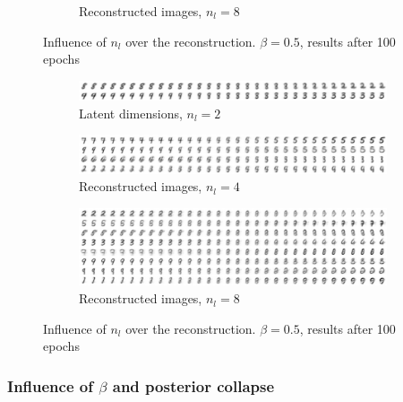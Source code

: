 \documentclass{article}
\begin{document}
\begin{figure}
\begin{subfigure}[b]{.2\textwidth}
    \caption{Reconstructed images, $n_l = 8$}
    \label{subfig:recons n_l=8}
  \end{subfigure}
  \caption{Influence of $n_l$ over the reconstruction. $\beta=0.5$, results after 100 epochs}
  \label{fig:n_l influence reconstruction}
\end{figure}

\begin{figure}
  \centering
  \begin{subfigure}[b]{.2\textwidth}
    \centering
    \includegraphics[width=\textwidth]{report/images/lat2/vae_0.5_0.5_ep100_lat2_hid512_2201-0938.pt_latent_dim.png}
    \caption{Latent dimensions, $n_l = 2$}
    \label{subfig:latent n_l=2}
  \end{subfigure}
  \hfill
  \begin{subfigure}[b]{.2\textwidth}
    \centering
    \includegraphics[width=\textwidth]{report/images/lat4/vae_0.5_0.5_ep100_lat4_hid512_2201-1012.pt_latent_dim.png}
    \caption{Reconstructed images, $n_l = 4$}
    \label{subfig:latent n_l=4}
  \end{subfigure}
  \hfill
  \begin{subfigure}[b]{.2\textwidth}
    \centering
    \includegraphics[width=\textwidth]{report/images/lat8/vae_0.5_0.5_ep100_lat8_hid512_2201-1114.pt_latent_dim.png}
    \caption{Reconstructed images, $n_l = 8$}
    \label{subfig:latent n_l=8}
  \end{subfigure}
  \caption{Influence of $n_l$ over the reconstruction. $\beta=0.5$, results after 100 epochs}
  \label{fig:n_l influence latent}
\end{figure}


\subsubsection{Influence of $\beta$ and posterior collapse}
\label{subsub:beta}
\end{document}
